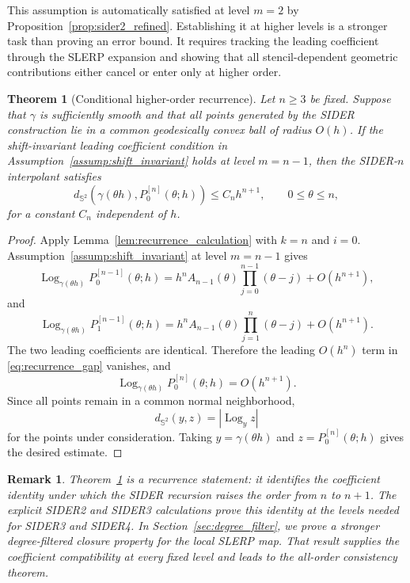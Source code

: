 \documentclass[a4paper,11pt]{article}
\newcommand{\bS}{\mathbb{S}}
\newcommand{\Log}{\operatorname{Log}}
\newtheorem{thm}{Theorem}
\newtheorem{remark}{Remark}
\numberwithin{equation}{section}
\begin{document}
This assumption is automatically satisfied at level \(m=2\) by
Proposition~\ref{prop:sider2_refined}.  Establishing it at higher levels is a
stronger task than proving an error bound.  It requires tracking the leading
coefficient through the SLERP expansion and showing that all stencil-dependent
geometric contributions either cancel or enter only at higher order.

\begin{thm}[Conditional higher-order recurrence]
\label{thm:conditional_all_order}
Let \(n\geq3\) be fixed.  Suppose that \(\gamma\) is sufficiently smooth and
that all points generated by the SIDER construction lie in a common
geodesically convex ball of radius \(O(h)\).  If the shift-invariant leading
coefficient condition in Assumption~\ref{assump:shift_invariant} holds at
level \(m=n-1\), then the SIDER-\(n\) interpolant satisfies
\[
        d_{\bS^2}\!\left(\gamma(\theta h),P_0^{[n]}(\theta;h)\right)
        \leq C_n h^{n+1},
        \qquad 0\leq\theta\leq n,
\]
for a constant \(C_n\) independent of \(h\).
\end{thm}

\begin{proof}
Apply Lemma~\ref{lem:recurrence_calculation} with \(k=n\) and \(i=0\).
Assumption~\ref{assump:shift_invariant} at level \(m=n-1\) gives
\[
\Log_{\gamma(\theta h)}P_0^{[n-1]}(\theta;h)
=
h^n A_{n-1}(\theta)
\prod_{j=0}^{n-1}(\theta-j)
+
O(h^{n+1}),
\]
and
\[
\Log_{\gamma(\theta h)}P_1^{[n-1]}(\theta;h)
=
h^n A_{n-1}(\theta)
\prod_{j=1}^{n}(\theta-j)
+
O(h^{n+1}).
\]
The two leading coefficients are identical.  Therefore the leading
\(O(h^n)\) term in \eqref{eq:recurrence_gap} vanishes, and
\[
        \Log_{\gamma(\theta h)}P_0^{[n]}(\theta;h)
        =
        O(h^{n+1}).
\]
Since all points remain in a common normal neighborhood,
\[
        d_{\bS^2}(y,z)=|\Log_y z|
\]
for the points under consideration.  Taking
\(y=\gamma(\theta h)\) and \(z=P_0^{[n]}(\theta;h)\) gives the desired
estimate.
\end{proof}

\begin{remark}
Theorem~\ref{thm:conditional_all_order} is a recurrence statement: it
identifies the coefficient identity under which the SIDER recursion raises the
order from \(n\) to \(n+1\).  The explicit SIDER2 and SIDER3 calculations prove
this identity at the levels needed for SIDER3 and SIDER4.  In
Section~\ref{sec:degree_filter}, we prove a stronger degree-filtered closure
property for the local SLERP map.  That result supplies the coefficient
compatibility at every fixed level and leads to the all-order consistency
theorem.
\end{remark}
\end{document}
